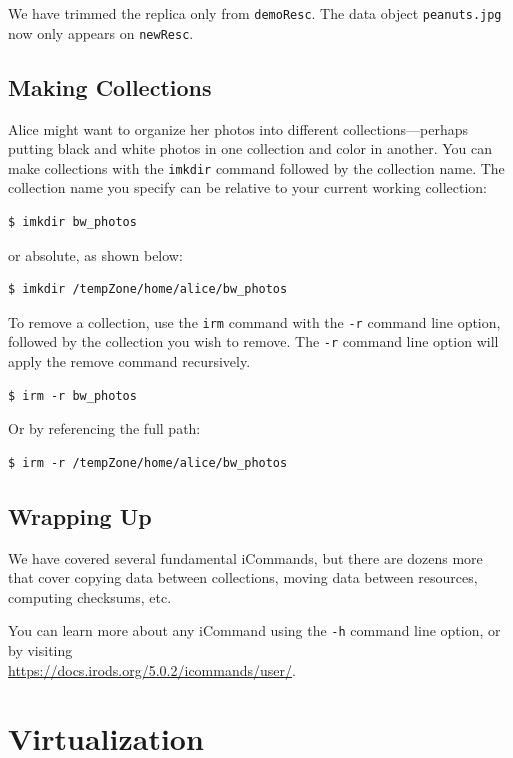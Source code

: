 \documentclass[10pt,oneside]{memoir}
\begin{document}
We have trimmed the replica only from \texttt{demoResc}. The data object \texttt{peanuts.jpg} now only appears on \texttt{newResc}.

\section{Making Collections}

Alice might want to organize her photos into different collections---perhaps putting black and white photos in one collection and color in another. You can make collections with the \texttt{imkdir} command followed by the collection name. The collection name you specify can be relative to your current working collection:

\begin{lstlisting}
$ imkdir bw_photos
\end{lstlisting}

or absolute, as shown below:

\begin{lstlisting}
$ imkdir /tempZone/home/alice/bw_photos
\end{lstlisting}

To remove a collection, use the \texttt{irm} command with the \texttt{-r} command line option, followed by the collection you wish to remove. The \texttt{-r} command line option will apply the remove command recursively.

\begin{lstlisting}
$ irm -r bw_photos
\end{lstlisting}

Or by referencing the full path:

\begin{lstlisting}
$ irm -r /tempZone/home/alice/bw_photos
\end{lstlisting}

\section{Wrapping Up}

We have covered several fundamental iCommands, but there are dozens more that cover copying data between collections, moving data between resources, computing checksums, etc.

You can learn more about any iCommand using the \texttt{-h} command line option, or by visiting \\
\url{https://docs.irods.org/5.0.2/icommands/user/}.

\chapter{Virtualization}
\end{document}
